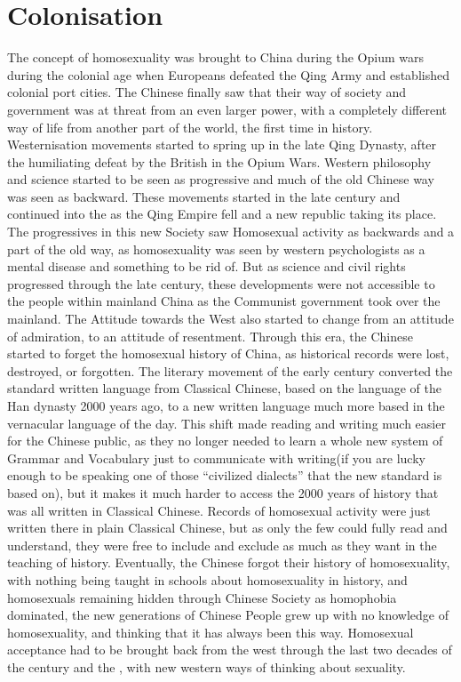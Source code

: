 \section{Colonisation}

The concept of homosexuality was brought to China during the Opium wars during the colonial age when Europeans defeated the Qing Army and established colonial port cities. The Chinese finally saw that their way of society and government was at threat from an even larger power, with a completely different way of life from another part of the world, the first time in history. Westernisation movements started to spring up in the late Qing Dynasty, after the humiliating defeat by the British in the Opium Wars. Western philosophy and science started to be seen as progressive and much of the old Chinese way was seen as backward. These movements started in the late  century and continued into the  as the Qing Empire fell and a new republic taking its place. The progressives in this new Society saw Homosexual activity as backwards and a part of the old way, as homosexuality was seen by western psychologists as a mental disease and something to be rid of\Autocite{1997後殖民同志}. But as science and civil rights progressed through the late  century, these developments were not accessible to the people within mainland China as the Communist government took over the mainland. The Attitude towards the West also started to change from an attitude of admiration, to an attitude of resentment. Through this era, the Chinese started to forget the homosexual history of China, as historical records were lost, destroyed, or forgotten\Autocite{1997後殖民同志}. The literary movement of the early  century converted the standard written language from Classical Chinese, based on the language of the Han dynasty 2000 years ago, to a new written language much more based in the vernacular language of the day. This shift made reading and writing much easier for the Chinese public, as they no longer needed to learn a whole new system of Grammar and Vocabulary just to communicate with writing(if you are lucky enough to be speaking one of those “civilized dialects” that the new standard is based on), but it makes it much harder to access the 2000 years of history that was all written in Classical Chinese. Records of homosexual activity were just written there in plain Classical Chinese, but as only the few could fully read and understand, they were free to include and exclude as much as they want in the teaching of history. Eventually, the Chinese forgot their history of homosexuality, with nothing being taught in schools about homosexuality in history, and homosexuals remaining hidden through Chinese Society as homophobia dominated, the new generations of Chinese People grew up with no knowledge of homosexuality, and thinking that it has always been this way. Homosexual acceptance had to be brought back from the west through the last two decades of the  century and the , with new western ways of thinking about sexuality.

